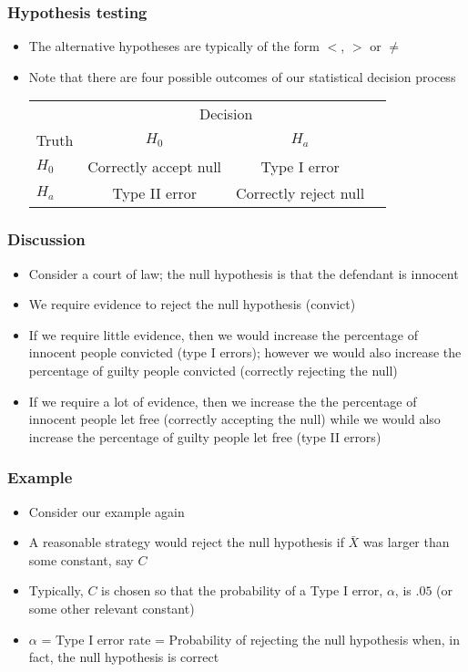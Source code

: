 \documentclass[aspectratio=169]{beamer}
\begin{document}
\begin{frame}\frametitle{Hypothesis testing}
\begin{itemize}
\item The alternative hypotheses are typically of the form $<$, $>$ or $\neq$
\item Note that there are four possible outcomes of our statistical decision
  process
\begin{center}
  \begin{tabular}{lccc}
      & \multicolumn{2}{c}{Decision} \\
Truth & $H_0$ & $H_a$ \\ \hline
$H_0$ & Correctly accept null & Type I error \\
$H_a$ & Type II error & Correctly reject null  \\ \hline
  \end{tabular}
\end{center}
\end{itemize}
\end{frame}

\begin{frame}\frametitle{Discussion}
\begin{itemize}
\item Consider a court of law; the null hypothesis is that the
  defendant is innocent
\item We require evidence to reject the null hypothesis (convict)
\item If we require little evidence, then we would increase the
  percentage of innocent people convicted (type I errors); however we
  would also increase the percentage of guilty people convicted
  (correctly rejecting the null)
\item If we require a lot of evidence, then we increase the the
  percentage of innocent people let free (correctly accepting the
  null) while we would also increase the percentage of guilty people
  let free (type II errors)
\end{itemize}
\end{frame}

\begin{frame}\frametitle{Example}
\begin{itemize}
\item Consider our example again
\item A reasonable strategy would reject the null hypothesis if
  $\bar X$ was larger than some constant, say $C$
\item Typically, $C$ is chosen so that the probability of a Type I
  error, $\alpha$, is $.05$ (or some other relevant constant)
\item $\alpha$ = Type I error rate = Probability of rejecting the null hypothesis
  when, in fact, the null hypothesis is correct
\end{itemize}
\end{frame}
\end{document}
